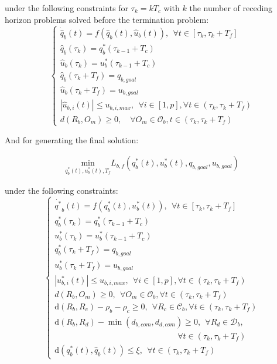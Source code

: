 \documentclass[eprint]{actapoly}
\begin{document}
under the following constraints for $\tau_k = kT_c$ with $k$ the number of receding horizon
problems solved before the termination problem:
\begin{equation}\label{eq:constsa}
\left\lbrace\begin{array}{lcl}
    \dot{\hat{q}}_b(t) = f(\hat{q}_b(t),\hat{u}_b(t)),\ \ \forall t \in [\tau_{k}, \tau_{k}+T_f]\\
    \hat{q}_b(\tau_{k}) = q^*_{b}(\tau_{k-1}+T_c)\\
    \hat{u}_b(\tau_{k}) = u^*_{b}(\tau_{k-1}+T_c)\\
    \hat{q}_b(\tau_{k}+T_f) = q_{b,goal}\\
    \hat{u}_b(\tau_{k}+T_f) = u_{b,goal}\\
    |\hat{u}_{b,i}(t)| \leq u_{b,i,max},\ \ \forall i \in [1,p],\forall t \in (\tau_{k}, \tau_{k}+T_f)\\
    d(R_b, O_m) \geq 0,\quad \forall O_m \in \mathcal{O}_b, t \in (\tau_{k}, \tau_{k}+T_f)
\end{array}\right.
\end{equation}

And for generating the final solution:

\begin{align}\label{eq:cost}
\underset{q^*_b(t),u^*_b(t),T_f}{\mathrm{min}} L_{b,f}(q^*_b(t), u^*_b(t), q_{b,goal},u_{b,goal})
\end{align}

under the following constraints:
\begin{equation}\label{eq:const}
\left\lbrace\begin{array}{lcl}
    \dot{q^*}_b(t) = f(q^*_b(t),u^*_b(t)),\ \ \forall t \in [\tau_{k}, \tau_{k}+T_f]\\
    q^*_b(\tau_{k}) = q^*_{b}(\tau_{k-1}+T_c)\\
    u^*_b(\tau_{k}) = u^*_{b}(\tau_{k-1}+T_c)\\
    q^*_b(\tau_{k}+T_f) = q_{b,goal}\\
    u^*_b(\tau_{k}+T_f) = u_{b,goal}\\
    |u^*_{b,i}(t)| \leq u_{b,i,max},\ \ \forall i \in [1,p],\forall t \in (\tau_{k}, \tau_{k}+T_f)\\
    d(R_b, O_m) \geq 0,\ \ \forall O_m \in \mathcal{O}_b, \forall t \in (\tau_{k}, \tau_{k}+T_f)\\
    \mathrm{d}(R_b, R_c) - \rho_b - \rho_c \geq 0,\ \ \forall R_c \in \mathcal{C}_b, \forall t \in (\tau_{k}, \tau_{k}+T_f)\\
    \mathrm{d}(R_b, R_d) - \min(d_{b,com},d_{d,com}) \geq 0,\ \ \forall R_d \in \mathcal{D}_b,\\
    \quad \quad \quad \quad \quad \quad \quad \quad \quad \quad \quad \quad \quad \quad \quad \forall t \in (\tau_{k}, \tau_{k}+T_f)\\
    \mathrm{d}(q^*_b(t), \hat{q}_b(t)) \leq \xi,\ \ \forall t \in (\tau_{k}, \tau_{k}+T_f)
\end{array}\right.
\end{equation}
\end{document}
